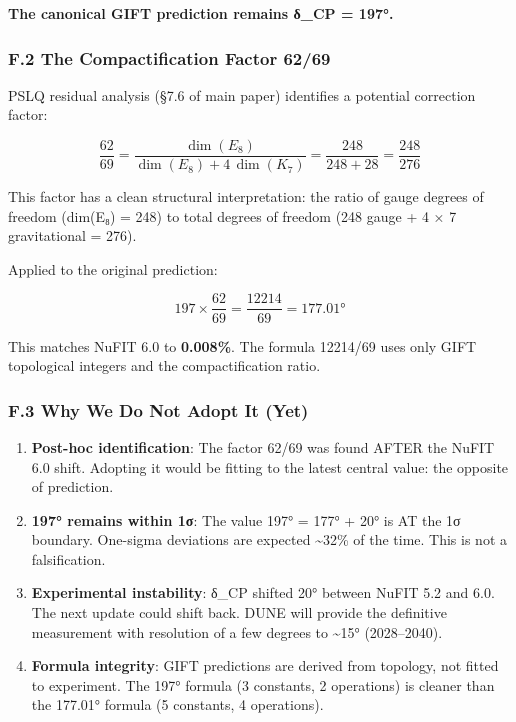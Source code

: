 \documentclass[11pt,a4paper]{article}
\begin{document}
\textbf{The canonical GIFT prediction remains δ\_CP = 197°.}

\subsubsection{F.2 The Compactification Factor 62/69}\label{f.2-the-compactification-factor-6269}

PSLQ residual analysis (§7.6 of main paper) identifies a potential correction factor:

\[\frac{62}{69} = \frac{\dim(E_8)}{\dim(E_8) + 4\,\dim(K_7)} = \frac{248}{248 + 28} = \frac{248}{276}\]

This factor has a clean structural interpretation: the ratio of gauge degrees of freedom
(dim(E₈) = 248) to total degrees of freedom (248 gauge + 4 × 7 gravitational = 276).

Applied to the original prediction:

\[197 \times \frac{62}{69} = \frac{12214}{69} = 177.01°\]

This matches NuFIT 6.0 to \textbf{0.008\%}. The formula 12214/69 uses only GIFT topological
integers and the compactification ratio.

\subsubsection{F.3 Why We Do Not Adopt It (Yet)}\label{f.3-why-we-do-not-adopt-it-yet}

\begin{enumerate}

\item
  \textbf{Post-hoc identification}: The factor 62/69 was found AFTER the NuFIT 6.0 shift.
  Adopting it would be fitting to the latest central value: the opposite of prediction.
\item
  \textbf{197° remains within 1σ}: The value 197° = 177° + 20° is AT the 1σ boundary.
  One-sigma deviations are expected \textasciitilde32\% of the time. This is not a falsification.
\item
  \textbf{Experimental instability}: δ\_CP shifted 20° between NuFIT 5.2 and 6.0.
  The next update could shift back. DUNE will provide the definitive measurement
  with resolution of a few degrees to \textasciitilde15° (2028--2040).
\item
  \textbf{Formula integrity}: GIFT predictions are derived from topology, not fitted
  to experiment. The 197° formula (3 constants, 2 operations) is cleaner than
  the 177.01° formula (5 constants, 4 operations).
\end{enumerate}
\end{document}
